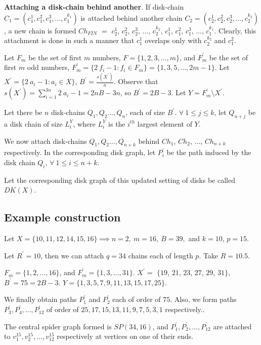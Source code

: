 \begin{definition}\label{AttachDCDG}
\textbf{Attaching a disk-chain behind another}. If disk-chain $C_1 = (c_1^1, c_1^2, c_1^3, ..., c_1^{k_1})$ is attached behind another chain $C_2 = (c_2^1, c_2^2, c_2^3, ..., c_2^{k_2})$, a new chain is formed $Ch_{FIN}$ $=$ $c_2^1$, $c_2^2$, $c_2^3$, $\dots$, $c_2^{k_2}$, $c_1^1$, $c_1^2$, $c_1^3$, $\dots$, $c_1^{k_1}$. Clearly, this attachment is done in such a manner that $c_1^1$ overlaps only with $c_2^{k_2}$ and $c_1^2$.
\end{definition}

Let $F_m$ be the set of first $m$ numbers, $F = \{1,2,3,...,m\}$, and $F^{\prime}_m$ be the set of first $m$ odd numbers, $F^\prime_m = \{2\ f_i-1: f_i \in F_m\} = \{1, 3, 5, . . ., 2m-1\}$. Let $X^\prime = \{2\ a_i-1:a_i \in X\}$, $B^\prime = \frac{s(X^\prime)}{n}$. Observe that $s(X^\prime) = \sum_{i=1}^{3n} 2\ a_i -1 = 2nB-3n$, so $B^\prime = 2B-3$. Let $Y=F^\prime_m\setminus X^\prime$.

Let there be $n$ disk-chains $Q_1,Q_2...,Q_n$, each of size $B^\prime$. $\forall\ 1\leq j\leq k$, let $Q_{n+j}$ be a disk chain of size $L^Y_i$, where $L^Y_i$ is the $i^{th}$ largest element of $Y$.

We now attach disk-chains $Q_1,Q_2...,Q_{n+k}$ behind $Ch_1$, $Ch_2$, $\dots$, $Ch_{n+k}$ respectively. In the corresponding disk graph, let $P_i^\prime$ be the path induced by the disk chain $Q_i$, $\forall\ 1\leq i\leq n+k$.

Let the corresponding disk graph of this updated setting of disks be called $DK(X)$.

\subsection{Example construction}

Let $X=\{10,11,12,14,15,16\} \implies n=2,\ m = 16,\ B = 39,$ and $k=10$, $p=15$.

Let $R^\prime=10$, then we can attach $q=34$ chains each of length $p$. Take $R=10.5$.

$F_m=\{1,2,...,16\}$, and $F_m^\prime=\{1,3,...,31\}$. $X^\prime =$ $\{19$, $21$, $23$, $27$, $29$, $31\}$, $B^\prime = 75=2B-3$. $Y=\{1,3,5,7,9,11,13,15,17,25\}$.

We finally obtain paths $P^\prime_1$ and $P^\prime_2$ each of order of $75$. Also, we form paths $P^\prime_3,P^\prime_4,...,P^\prime_{12}$ of order of $25,17,15,13,11,9,7,5,3,1$ respectively..

The central spider graph formed is $SP(34,16)$, and $P^\prime_1,P^\prime_2,...,P^\prime_{12}$ are attached to $v_1^{15},v_2^{15},...,v_{12}^{15}$ respectively at vertices on one of their ends.

